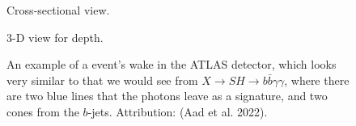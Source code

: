 \documentclass[
  11pt,
  numbers=noendperiod]{book}
\begin{document}
\begin{figure}

\begin{minipage}[t]{0.50\linewidth}

{\centering 


\caption*{Cross-sectional view.}

}

\end{minipage}%
%
\begin{minipage}[t]{0.50\linewidth}

{\centering 


\caption*{3-D view for depth.}

}

\end{minipage}%

\caption{\label{fig-evt}An example of a event's wake in the ATLAS
detector, which looks very similar to that we would see from
\(X\rightarrow SH \rightarrow b\bar{b}\gamma\gamma\), where there are
two blue lines that the photons leave as a signature, and two cones from
the \(b\)-jets. Attribution: (Aad et al. 2022).}

\end{figure}
\end{document}
